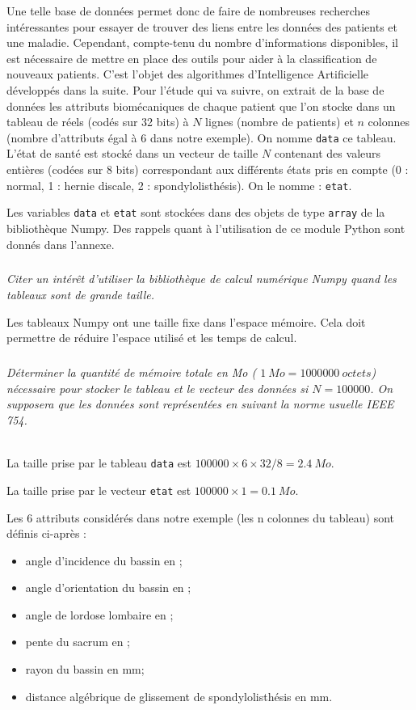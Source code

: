 \ifprof
\else
Une telle base de données permet donc de faire de nombreuses recherches intéressantes pour essayer
de trouver des liens entre les données des patients et une maladie. Cependant, compte-tenu du nombre
d’informations disponibles, il est nécessaire de mettre en place des outils pour aider à la classification
de nouveaux patients. C’est l’objet des algorithmes d’Intelligence Artificielle développés dans la suite.
Pour l’étude qui va suivre, on extrait de la base de données les attributs biomécaniques de chaque
patient que l’on stocke dans un tableau de réels (codés sur 32 bits) à $N$ lignes (nombre de patients)
et $n$ colonnes (nombre d’attributs égal à 6 dans notre exemple). On nomme \texttt{data} ce tableau. L’état
de santé est stocké dans un vecteur de taille $N$ contenant des valeurs entières (codées sur 8 bits)
correspondant aux différents états pris en compte (0 : normal, 1 : hernie discale, 2 : spondylolisthésis).
On le nomme : \texttt{etat}.

Les variables \texttt{data} et \texttt{etat} sont stockées dans des objets de type \texttt{array} de la bibliothèque Numpy.
Des rappels quant à l’utilisation de ce module Python sont donnés dans l’annexe.
\fi

\subparagraph{}\textit{Citer un intérêt d’utiliser la bibliothèque de calcul numérique Numpy quand les tableaux sont
de grande taille.}
\ifprof
\begin{corrige}
Les tableaux Numpy ont une taille fixe dans l'espace mémoire. Cela doit permettre de réduire l'espace utilisé et les temps de calcul. 
\end{corrige}
\else
\fi

\subparagraph{}\textit{Déterminer la quantité de mémoire totale en Mo ( $\SI{1}{Mo} = \SI{1 000 000}{octets}$) nécessaire pour stocker le tableau et le vecteur des données si $N = \num{100 000}$. On supposera que les données
sont représentées en suivant la norme usuelle IEEE 754.}
\ifprof
\begin{corrige} ~\\

La taille prise par le tableau \texttt{data} est $\num{100000} \times 6 \times 32/8=\SI{2,4}{Mo}$. 

La taille prise par le vecteur \texttt{etat} est $\num{100000} \times 1=\SI{0,1}{Mo}$.
\end{corrige}
\else
\fi

\ifprof
\else
Les 6 attributs considérés dans notre exemple (les n colonnes du tableau) sont définis ci-après :
\begin{itemize}
\item angle d’incidence du bassin en \degres ;
\item angle d’orientation du bassin en \degres ;
\item angle de lordose lombaire en \degres ;
\item pente du sacrum en \degres ;
\item rayon du bassin en mm;
\item distance algébrique de glissement de spondylolisthésis en mm.
\end{itemize}

